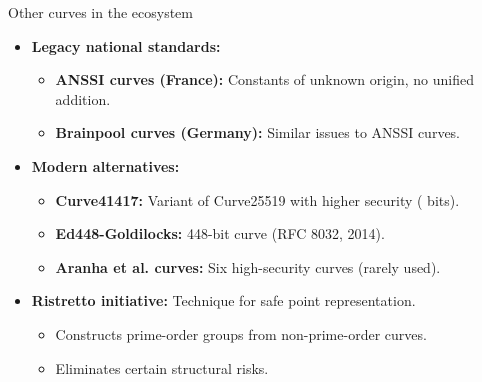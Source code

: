 \documentclass[aspectratio=169, lualatex, handout]{beamer}
\begin{document}
\begin{frame}{Other curves in the ecosystem}
	\begin{itemize}
		\item \textbf{Legacy national standards:}
		      \begin{itemize}
			      \item \textbf{ANSSI curves (France):} Constants of unknown origin, no unified addition.
			      \item \textbf{Brainpool curves (Germany):} Similar issues to ANSSI curves.
		      \end{itemize}
		\item \textbf{Modern alternatives:}
		      \begin{itemize}
			      \item \textbf{Curve41417:} Variant of Curve25519 with higher security ( bits).
			      \item \textbf{Ed448-Goldilocks:} 448-bit curve (RFC 8032, 2014).
			      \item \textbf{Aranha et al. curves:} Six high-security curves (rarely used).
		      \end{itemize}
		\item \textbf{Ristretto initiative:} Technique for safe point representation.
		      \begin{itemize}
			      \item Constructs prime-order groups from non-prime-order curves.
			      \item Eliminates certain structural risks.
		      \end{itemize}
	\end{itemize}
\end{frame}
\end{document}
